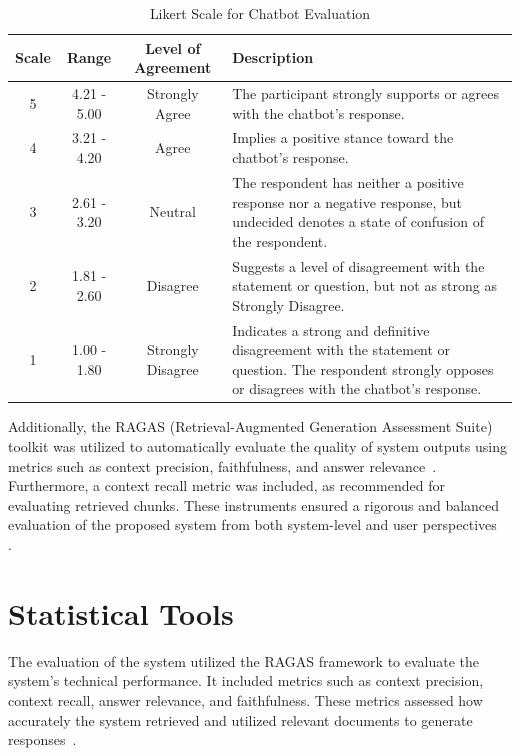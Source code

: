 \begin{refsection}
\begin{table}[H]
    \centering
    \caption{Likert Scale for Chatbot Evaluation}
    \begin{tabular}{|c|c|c|m{7cm}|}
        \hline
        \textbf{Scale} & \textbf{Range} & \textbf{Level of Agreement} & \textbf{Description} \\
        \hline
                5 & 4.21 - 5.00 & Strongly Agree & The participant strongly supports or agrees with the chatbot's response.\\
        \hline
                4 & 3.21 - 4.20 & Agree & Implies a positive stance toward the chatbot's response. \\
        \hline
                3 & 2.61 - 3.20 & Neutral & The respondent has neither a positive response nor a negative response, but undecided denotes a state of confusion of the respondent. \\
        \hline
                2 & 1.81 - 2.60 & Disagree & Suggests a level of disagreement with the statement or question, but not as strong as Strongly Disagree.\\
        \hline
                1 & 1.00 - 1.80 & Strongly Disagree & Indicates a strong and definitive disagreement with the statement or question. The respondent strongly opposes or disagrees with the chatbot's response.\\
        \hline
    \end{tabular}
    \label{tab:likert}
\end{table}


Additionally, the RAGAS (Retrieval-Augmented Generation Assessment Suite) toolkit was utilized to automatically evaluate the quality of system outputs using metrics such as context precision, faithfulness, and answer relevance~\cite{shinn2023ragas}. Furthermore, a context recall metric was included, as recommended for evaluating retrieved chunks. These instruments ensured a rigorous and balanced evaluation of the proposed system from both system-level and user perspectives~ \cite{lin2021bert}.

\section{Statistical Tools}

The evaluation of the system utilized the RAGAS framework to evaluate the system's technical performance. It included metrics such as context precision, context recall, answer relevance, and faithfulness. These metrics assessed how accurately the system retrieved and utilized relevant documents to generate responses~\cite{holmes2023chatbot, ameli2024ranking, lin2024satisfaction}.


\end{refsection}
